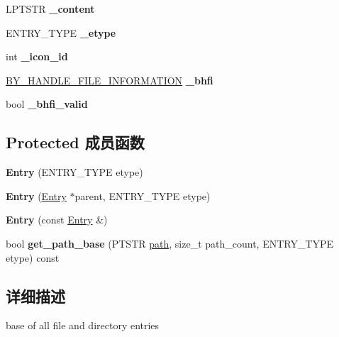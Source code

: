 \begin{DoxyCompactItemize}
L\+P\+T\+S\+TR {\bfseries \+\_\+content}
\item 
\mbox{\label{struct_entry_a405da020f46e291295ab0cbdd5f2a726}} 
E\+N\+T\+R\+Y\+\_\+\+T\+Y\+PE {\bfseries \+\_\+etype}
\item 
\mbox{\label{struct_entry_a1b5200edc57c7cbdfb2b747c9ec661d0}} 
int {\bfseries \+\_\+icon\+\_\+id}
\item 
\mbox{\label{struct_entry_a476581cf65f416884c549e98a16986ae}} 
\hyperlink{struct___b_y___h_a_n_d_l_e___f_i_l_e___i_n_f_o_r_m_a_t_i_o_n}{B\+Y\+\_\+\+H\+A\+N\+D\+L\+E\+\_\+\+F\+I\+L\+E\+\_\+\+I\+N\+F\+O\+R\+M\+A\+T\+I\+ON} {\bfseries \+\_\+bhfi}
\item 
\mbox{\label{struct_entry_a76bba893a418d6ebea6b0d0ff6fc3aae}} 
bool {\bfseries \+\_\+bhfi\+\_\+valid}
\end{DoxyCompactItemize}
\subsection*{Protected 成员函数}
\begin{DoxyCompactItemize}
\item 
\mbox{\label{struct_entry_a5ce1d466cffb47445b3870a0c693f250}} 
{\bfseries Entry} (E\+N\+T\+R\+Y\+\_\+\+T\+Y\+PE etype)
\item 
\mbox{\label{struct_entry_ad75b5572337f8b25f2456d66722a9e84}} 
{\bfseries Entry} (\hyperlink{struct_entry}{Entry} $\ast$parent, E\+N\+T\+R\+Y\+\_\+\+T\+Y\+PE etype)
\item 
\mbox{\label{struct_entry_a98c62e07d86951008cc8a0d60632c262}} 
{\bfseries Entry} (const \hyperlink{struct_entry}{Entry} \&)
\item 
\mbox{\label{struct_entry_a7240ded1cd8236289afefcf29fcae521}} 
bool {\bfseries get\+\_\+path\+\_\+base} (P\+T\+S\+TR \hyperlink{structpath}{path}, size\+\_\+t path\+\_\+count, E\+N\+T\+R\+Y\+\_\+\+T\+Y\+PE etype) const
\end{DoxyCompactItemize}


\subsection{详细描述}
base of all file and directory entries 

